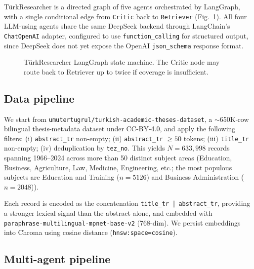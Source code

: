 \documentclass[conference]{IEEEtran}
\begin{document}
T\"urkResearcher is a directed graph of five agents orchestrated by
LangGraph, with a single conditional edge from \texttt{Critic} back to
\texttt{Retriever} (Fig.~\ref{fig:arch}). All four LLM-using agents share the
same DeepSeek backend through LangChain's \texttt{ChatOpenAI} adapter,
configured to use \texttt{function\_calling} for structured output, since
DeepSeek does not yet expose the OpenAI \texttt{json\_schema} response
format.

\begin{figure}[t]
\centering
\caption{T\"urkResearcher LangGraph state machine. The Critic node may route
back to Retriever up to twice if coverage is insufficient.}
\label{fig:arch}
\end{figure}

\subsection{Data pipeline}

We start from \texttt{umutertugrul/turkish-academic-theses-dataset}, a
$\sim$650K-row bilingual thesis-metadata dataset under CC-BY-4.0, and apply
the following filters:
(i) \texttt{abstract\_tr} non-empty;
(ii) \texttt{abstract\_tr} $\geq 50$ tokens;
(iii) \texttt{title\_tr} non-empty;
(iv) deduplication by \texttt{tez\_no}.
This yields $N{=}633{,}998$ records spanning 1966--2024 across more than
50 distinct subject areas (Education, Business, Agriculture, Law, Medicine,
Engineering, etc.; the most populous subjects are Education and Training
($n{=}5126$) and Business Administration ($n{=}2048$)).

Each record is encoded as the concatenation
\texttt{title\_tr}~$\Vert$~\texttt{abstract\_tr}, providing a stronger
lexical signal than the abstract alone, and embedded with
\texttt{paraphrase-multilingual-mpnet-base-v2} (768-dim). We persist
embeddings into Chroma using cosine distance (\texttt{hnsw:space=cosine}).

\subsection{Multi-agent pipeline}
\end{document}
